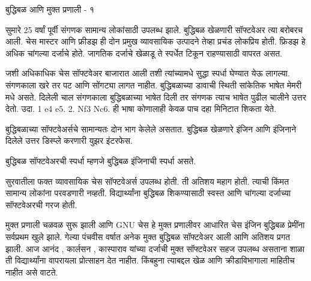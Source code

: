 \documentclass[17pt]{extarticle}
\begin{document}
बुद्धिबळ आणि मुक्त प्रणाली - १

सुमारे 25 वर्षां पूर्वी संगणक सामान्य लोकांसाठी उपलब्ध झाले. बुद्धिबळ खेळणारी सॉफ्टवेअर त्या बरोबरच आली.  चेस मास्टर आणि फ्रीडझ ही दोन प्रमुख व्यावसायिक उत्पादने तेव्हा प्रचंड लोकप्रिय होती. फ्रिडझ हे अधिक चांगल्या दर्जाचे होते. जागतिक दर्जाचे खेळाडू ते स्पर्धेत टिकून राहण्यासाठी वापरत असत.

जशी अधिकाधिक चेस सॉफ्टवेअर बाजारात आली तशी त्यांच्यामधे सुद्धा स्पर्धा घेण्यात येऊ लागल्या.  संगणकाला खरे तर पट आणि सोंगट्या लागत नाहीत. बुद्धिबळाच्या डावाची स्थिती सांकेतिक भाषेत मेमरी मधे असते. दिलेली चाल संगणकाला बुद्धिबळाच्या भाषेत दिली तर संगणक त्याच भाषेत पुढील चालीने उत्तर देतो. उदा.  1 e4 e5. 2. Nf3 Nc6.  ही भाषा कोणालाही केवळ पाच दहा मिनिटात शिकता येते.

 बुद्धिबळाच्या सॉफ्टवेअर्सचे सामान्यतः दोन भाग केलेले असतात. बुद्धिबळ खेळणारे इंजिन आणि इंजिनाने दिलेले उत्तर डिस्प्ले करणारी युझर इंटरफेस.  

बुद्धिबळ सॉफ्टवेअरची स्पर्धा म्हणजे बुद्धिबळ इंजिनाची स्पर्धा असते.

सुरवातीला फक्त व्यावसायिक चेस सॉफ्टवेअर्स उपलब्ध होती. ती अतिशय महाग होती. त्याची किंमत सामान्य लोकांना परवडणारी नव्हती. विद्यार्थ्यांना बुद्धिबळ शिकण्यासाठी स्वस्त आणि चांगल्या दर्जाच्या सॉफ्टवेअरची गरज होती. 

 मुक्त प्रणाली चळवळ सुरू झाली आणि GNU चेस हे मुक्त प्रणालीवर आधारित चेस इंजिन बुद्धिबळ प्रेमींना सर्वप्रथम खुले झाले. गेल्या पंचवीस वर्षात अनेक मुक्त बुद्धिबळ सॉफ्टवेअर आली आणि अतिशय प्रगत झाली. आज आनंद , कार्लसन , कास्पाराव यांच्या दर्जाची मुक्त सॉफ्टवेअर सहज उपलब्ध असताना शाळा ती विद्यार्थ्यांना वापरायला प्रोत्साहन देत नाहीत. किंबहुना त्याबद्दल खेळ आणि क्रीडाविभागाला माहितीच नाहीत असे वाटते.
\end{document}

